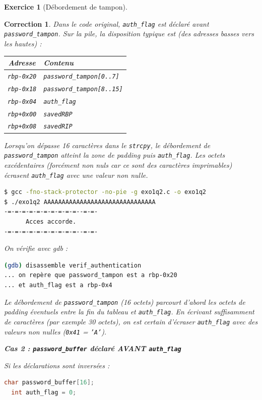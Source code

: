 \documentclass[a4paper,11pt]{article}
\theoremstyle{plain}
\newtheorem{correction}{Correction}
\theoremstyle{definition}
\newtheorem{exercice}{Exercice}
\begin{document}
\begin{exercice}[Débordement de tampon]
\begin{enumerate}
\begin{correction}
Dans le code original, \texttt{auth\_flag} est déclaré avant \texttt{password\_tampon}. Sur la pile, la disposition typique est (des adresses basses vers les hautes) :

\begin{center}
\begin{tabular}{|c|l|}
\hline
\textbf{Adresse} & \textbf{Contenu} \\
\hline
\texttt{rbp-0x20} & \texttt{password\_tampon[0..7]} \\
\texttt{rbp-0x18} & \texttt{password\_tampon[8..15]} \\
\texttt{rbp-0x04} & \texttt{auth\_flag} \\
\texttt{rbp+0x00} & \texttt{savedRBP} \\
\texttt{rbp+0x08} & \texttt{savedRIP} \\
\hline
\end{tabular}
\end{center}

Lorsqu'on dépasse 16 caractères dans le \texttt{strcpy}, le débordement de \texttt{password\_tampon} atteint la zone de padding puis \texttt{auth\_flag}. Les octets excédentaires (forcément non nuls car ce sont des caractères imprimables) écrasent \texttt{auth\_flag} avec une valeur non nulle.

\begin{lstlisting}[language=bash,numbers=none]
$ gcc -fno-stack-protector -no-pie -g exo1q2.c -o exo1q2
$ ./exo1q2 AAAAAAAAAAAAAAAAAAAAAAAAAAAAAAA
-=-=-=-=-=-=-=-=-=-=--=-=-
      Acces accorde.
-=-=-=-=-=-=-=-=-=-=--=-=-
\end{lstlisting}

On vérifie avec gdb :
\begin{lstlisting}[language=bash,numbers=none]
(gdb) disassemble verif_authentication
... on repère que password_tampon est a rbp-0x20
... et auth_flag est a rbp-0x4
\end{lstlisting}

Le débordement de \texttt{password\_tampon} (16 octets) parcourt d'abord les octets de padding éventuels entre la fin du tableau et \texttt{auth\_flag}. En écrivant suffisamment de caractères (par exemple 30 octets), on est certain d'écraser \texttt{auth\_flag} avec des valeurs non nulles (\texttt{0x41} = \texttt{'A'}).

\bigskip

\textbf{Cas 2 : \texttt{password\_buffer} déclaré AVANT \texttt{auth\_flag}}

Si les déclarations sont inversées :
\begin{lstlisting}[language=C,numbers=none]
  char password_buffer[16];
  int auth_flag = 0;
\end{lstlisting}


\end{correction}
\end{enumerate}
\end{exercice}
\end{document}
